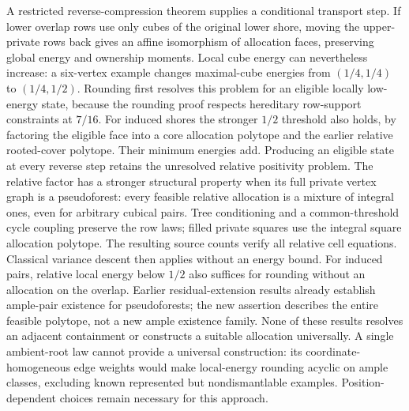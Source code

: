 \documentclass[11pt]{article}
\theoremstyle{definition}
\begin{document}
A restricted reverse-compression theorem supplies a conditional transport
step. If lower overlap rows use only cubes of the original lower shore,
moving the upper-private rows back gives an affine isomorphism of allocation
faces, preserving global energy and ownership moments. Local cube energy
can nevertheless increase: a six-vertex example changes maximal-cube
energies from $(1/4,1/4)$ to $(1/4,1/2)$. Rounding first resolves this
problem for an eligible locally low-energy state, because the rounding
proof respects hereditary row-support constraints at $7/16$. For induced
shores the stronger $1/2$ threshold also holds, by factoring the eligible
face into a core allocation polytope and the earlier relative rooted-cover
polytope. Their minimum energies add. Producing an eligible
state at every reverse step retains the unresolved relative positivity
problem.
The relative factor has a stronger structural property when its full private
vertex graph is a pseudoforest: every feasible relative allocation is a mixture
of integral ones, even for arbitrary cubical pairs. Tree conditioning and a
common-threshold cycle coupling preserve the row laws; filled private squares
use the integral square allocation polytope. The resulting source counts
verify all relative cell equations. Classical variance descent then applies
without an energy bound. For induced pairs, relative local energy below
$1/2$ also suffices for rounding without an allocation on the overlap.
Earlier residual-extension results already establish ample-pair existence
for pseudoforests; the new assertion describes the entire feasible polytope,
not a new ample existence family. None of these results resolves an adjacent
containment or constructs a suitable allocation universally.
A single ambient-root law cannot provide a universal construction: its
coordinate-homogeneous edge weights would make local-energy rounding
acyclic on ample classes, excluding known represented but nondismantlable
examples. Position-dependent choices remain necessary for this approach.
\end{document}
